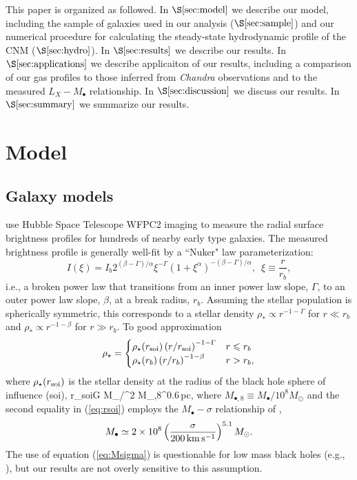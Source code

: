 \documentclass[usenatbib,fleqn]{mn2e}
\newcommand{\rb}{r_b}
\newcommand{\rhostar}{\rho_*}
\newcommand{\Mbh}[1][]{M_{\bullet#1}}
\newcommand{\soi}{\rm soi}
\newcommand{\rsoi}{r_{\soi}}
\begin{document}
This paper is organized as followed.  In $\S\ref{sec:model}$ we
describe our model, including the sample of galaxies used in our
analysis ($\S\ref{sec:sample}$) and our numerical procedure for
calculating the steady-state hydrodynamic profile of the CNM
($\S\ref{sec:hydro}$).  In $\S\ref{sec:results}$ we describe our
results.  In $\S\ref{sec:applications}$ we describe applicaiton of our
results, including a comparison of our gas profiles to those inferred
from {\it Chandra} observations and to the measured $L_X-\Mbh$
relationship.  In $\S\ref{sec:discussion}$ we discuss our results.  In
$\S\ref{sec:summary}$ we summarize our results.
\section{Model}
\label{sec:model}
\subsection{Galaxy models}
\citet{LauerFaber+:2007a} use Hubble Space Telescope WFPC2 imaging to measure the radial surface brightness profiles for hundreds of nearby early type galaxies. The measured brightness profile is generally well-fit by a ``Nuker" law parameterization:
\begin{equation}
  I(\xi)=I_b 2^{(\beta-\Gamma)/\alpha} \xi^{-\Gamma} (1+\xi^\alpha)^{-(\beta-\Gamma)/\alpha}, \,\,\,\xi\equiv\frac{r}{r_b},
\end{equation}
i.e., a broken power law that transitions from an inner power law slope, $\Gamma$, to an outer power law slope, $\beta$, at a break radius, $\rb$.  Assuming the stellar population is spherically symmetric, this corresponds to a stellar density $\rhostar \propto r^{-1-\Gamma}$ for $r \ll \rb$ and $\rhostar\propto r^{-1-\beta}$ for $r \gg \rb$.  To good approximation
\begin{align}
\rho_\star = 
\begin{cases}
\rho_\star(\rsoi) \left(r/\rsoi\right)^{-1-\Gamma} & r \leq r_b\\
\rho_\star(r_b) \left(r/r_b\right)^{-1-\beta} & r > r_b,
\label{eq:rhostar}
\end{cases}
\end{align}
where $\rho_\star(\rsoi)$ is the stellar density at the radius of the black hole sphere of influence (soi), 
\be
\rsoi \simeq G \Mbh/\sigma^2  M_{\bullet,8}^{0.6}\,{\rm pc},
\label{eq:rsoi}
\ee
where $M_{\bullet,8} \equiv M_{\bullet}/10^{8}M_{\odot}$ and the second equality in (\ref{eq:rsoi}) employs the $\Mbh-\sigma$ relationship of \citet{Gultekin+09},
 \begin{align}
M_{\bullet} \simeq 2\times 10^{8}\left(\frac{\sigma}{200\,{\rm
      km\,s^{-1}}}\right)^{5.1}M_{\odot}.
\label{eq:Msigma}
\end{align}
The use of equation (\ref{eq:Msigma}) is questionable for low mass black holes (e.g., \citealt{Greene&Ho07}), but our results are not overly sensitive to this assumption.  
\end{document}
